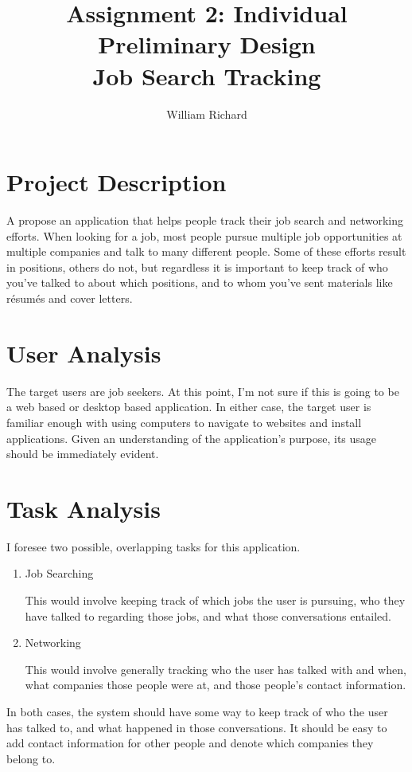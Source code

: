 \documentclass[12pt, letter]{article}
\title{Assignment 2: Individual Preliminary Design \\ Job Search Tracking}
\author{William Richard}
\begin{document}
\maketitle

\section{Project Description}
A propose an application that helps people track their job search and networking efforts.  When looking for a job, most people pursue multiple job opportunities at multiple companies and talk to many different people.  Some of these efforts result in positions, others do not, but regardless it is important to keep track of who you've talked to about which positions, and to whom you've sent materials like r\'{e}sum\'{e}s and cover letters.

\section{User Analysis}
The target users are job seekers.  At this point, I'm not sure if this is going to be a web based or desktop based application.  In either case, the target user is familiar enough with using computers to navigate to websites and install applications.  Given an understanding of the application's purpose, its usage should be immediately evident.  

\section{Task Analysis}
I foresee two possible, overlapping tasks for this application.
\begin{enumerate}
\item Job Searching

This would involve keeping track of which jobs the user is pursuing, who they have talked to regarding those jobs, and what those conversations entailed.
\item Networking

This would involve generally tracking who the user has talked with and when, what companies those people were at, and those people's contact information.
\end{enumerate}
In both cases, the system should have some way to keep track of who the user has talked to, and what happened in those conversations.  It should be easy to add contact information for other people and denote which companies they belong to.  
\end{document}
